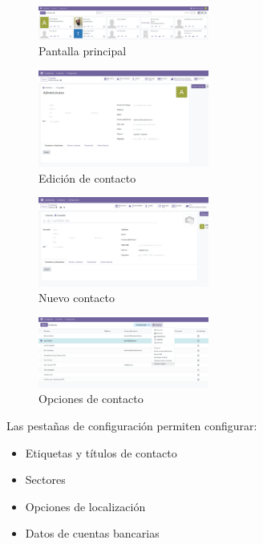 \documentclass[a4paper,12pt]{article}
\begin{document}
\begin{figure}[h!]
    \centering
    \includegraphics[width=0.5\textwidth]{pr2odoo62-pantallaPrincipal.png}
    \caption{Pantalla principal}
\end{figure}
\FloatBarrier

\begin{figure}[h!]
    \centering
    \includegraphics[width=0.5\textwidth]{pr2odoo63-edicionContacto.png}
    \caption{Edición de contacto}
\end{figure}
\FloatBarrier


\begin{figure}[h!]
    \centering
    \includegraphics[width=0.5\textwidth]{pr2odoo64-nuevoContacto.png}
    \caption{Nuevo contacto}
\end{figure}
\FloatBarrier


\begin{figure}[h!]
    \centering
    \includegraphics[width=0.5\textwidth]{pr2odoo65-opcionesContacto.png}
    \caption{Opciones de contacto}
\end{figure}
\FloatBarrier

Las pestañas de configuración permiten configurar:
\begin{itemize}
    \item Etiquetas y títulos de contacto
    \item Sectores
    \item Opciones de localización
    \item Datos de cuentas bancarias
\end{itemize}
\end{document}
